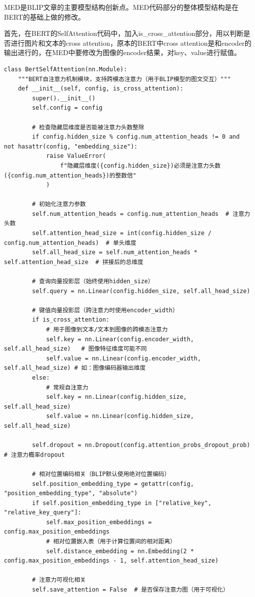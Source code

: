 \documentclass[zihao=false,fontset=windows]{ctexart}
\begin{document}
\par\vspace{1.15em}\par\vspace{0.28em}
MED是BLIP文章的主要模型结构创新点。MED代码部分的整体模型结构是在BERT的基础上做的修改。\par
首先，在BERT的SelfAttention代码中，加入is\_cross\_attention部分，用以判断是否进行图片和文本的cross attention，原本的BERT中cross attention是和encoder的输出进行的，在MED中要修改为图像的encoder结果，对key、value进行赋值。\par
\begin{feishucode}
\begin{lstlisting}
class BertSelfAttention(nn.Module):
    """BERT自注意力机制模块，支持跨模态注意力（用于BLIP模型的图文交互）"""
    def __init__(self, config, is_cross_attention):
        super().__init__()
        self.config = config
        
        # 检查隐藏层维度是否能被注意力头数整除
        if config.hidden_size % config.num_attention_heads != 0 and not hasattr(config, "embedding_size"):
            raise ValueError(
                f"隐藏层维度({config.hidden_size})必须是注意力头数({config.num_attention_heads})的整数倍"
            )
        
        # 初始化注意力参数
        self.num_attention_heads = config.num_attention_heads  # 注意力头数
        self.attention_head_size = int(config.hidden_size / config.num_attention_heads)  # 单头维度
        self.all_head_size = self.num_attention_heads * self.attention_head_size  # 拼接后的总维度

        # 查询向量投影层（始终使用hidden_size）
        self.query = nn.Linear(config.hidden_size, self.all_head_size)
        
        # 键值向量投影层（跨注意力时使用encoder_width）
        if is_cross_attention:
            # 用于图像到文本/文本到图像的跨模态注意力
            self.key = nn.Linear(config.encoder_width, self.all_head_size)   # 图像特征维度可能不同
            self.value = nn.Linear(config.encoder_width, self.all_head_size) # 如：图像编码器输出维度
        else:
            # 常规自注意力
            self.key = nn.Linear(config.hidden_size, self.all_head_size)
            self.value = nn.Linear(config.hidden_size, self.all_head_size)

        self.dropout = nn.Dropout(config.attention_probs_dropout_prob)  # 注意力概率dropout
        
        # 相对位置编码相关（BLIP默认使用绝对位置编码）
        self.position_embedding_type = getattr(config, "position_embedding_type", "absolute")
        if self.position_embedding_type in ["relative_key", "relative_key_query"]:
            self.max_position_embeddings = config.max_position_embeddings
            # 相对位置嵌入表（用于计算位置间的相对距离）
            self.distance_embedding = nn.Embedding(2 * config.max_position_embeddings - 1, self.attention_head_size)
        
        # 注意力可视化相关
        self.save_attention = False  # 是否保存注意力图（用于可视化）
\end{lstlisting}
\end{feishucode}
\end{document}
